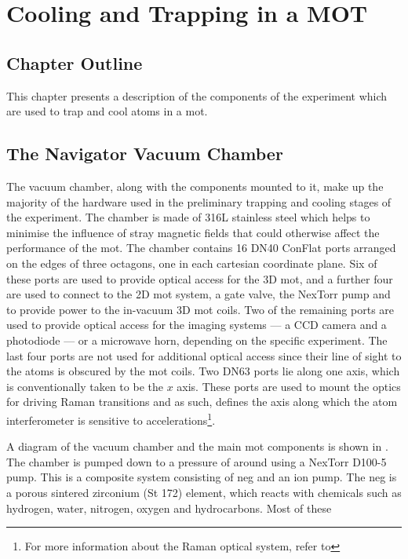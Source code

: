 \chapter{Cooling and Trapping in a MOT}
\section{Chapter Outline}
This chapter presents a description of the components of the experiment which
are used to trap and cool atoms in a \ac{mot}.
\section{The Navigator Vacuum Chamber}\label{sec:vacuum_chamber}
The vacuum chamber, along with the components mounted to it, make up the
majority of the hardware used in the preliminary trapping and cooling stages
of the experiment. The chamber is made of 316L stainless steel which helps to
minimise the influence of stray magnetic fields that could otherwise affect
the performance of the \ac{mot}. The chamber contains 16 DN40 ConFlat ports
arranged on the edges of three octagons, one in each cartesian coordinate
plane. Six of these ports are used to provide optical access for the 3D
\ac{mot}, and a further four are used to connect to the 2D \ac{mot} system, a
gate valve, the NexTorr pump and to provide power to the in-vacuum 3D
\ac{mot} coils. Two of the remaining ports are used to provide optical access
for the imaging systems --- a CCD camera and a photodiode --- or a microwave
horn, depending on the specific experiment. The last four ports are not used
for additional optical access since their line of sight to the atoms is
obscured by the \ac{mot} coils. Two DN63 ports lie along one axis, which is
conventionally taken to be the \(x\) axis. These ports are used to mount the
optics for driving Raman transitions and as such, defines the axis along
which the atom interferometer is sensitive to accelerations\footnote{For more
	information about the Raman optical system, refer to
	}. \par\noindent
A diagram of the vacuum chamber and the main \ac{mot} components is shown in
. The chamber is pumped down to a pressure of
around \sivalue{}{\milli\bar} using a NexTorr D100-5 pump. This
is a composite system consisting of \ac{neg} and an ion pump. The \ac{neg} is
a porous sintered zirconium (St 172) element, which reacts with chemicals
such as hydrogen, water, nitrogen, oxygen and hydrocarbons. Most of these
